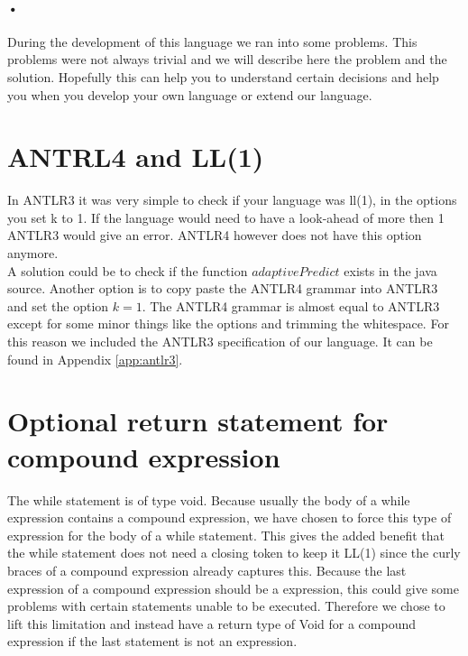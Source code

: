 \paragraph{•}
During the development of this language we ran into some problems. This problems were not always trivial and we will describe here the problem and the solution. Hopefully this can help you to understand certain decisions and help you when you develop your own language or extend our language.
\section{ANTRL4 and LL(1)}
In ANTLR3 it was very simple to check if your language was ll(1), in the options you set k to 1. If the language would need to have a look-ahead of more then 1 ANTLR3 would give an error. ANTLR4 however does not have this option anymore. \\
A solution could be to check if the function $adaptivePredict$ exists in the java source. Another option is to copy paste the ANTLR4 grammar into ANTLR3 and set the option $k=1$. The ANTLR4 grammar is almost equal to ANTLR3 except for some minor things like the options and trimming the whitespace. For this reason we included the ANTLR3 specification of our language. It can be found in Appendix \ref{app:antlr3}.

\section{Optional return statement for compound expression}
The while statement is of type void. Because usually the body of a while expression contains a compound expression, we have chosen to force this type of expression for the body of a while statement. This gives the added benefit that the while statement does not need a closing token to keep it LL(1) since the curly braces of a compound expression already captures this. Because the last expression of a compound expression should be a expression, this could give some problems with certain statements unable to be executed. Therefore we chose to lift this limitation and instead have a return type of Void for a compound expression if the last statement is not an expression.
